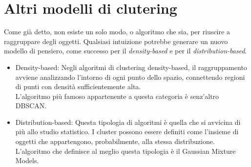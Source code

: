 \section{Altri modelli di clutering}
	Come già detto, non esiste un solo modo, o algoritmo che sia, per riuscire a raggruppare degli oggetti. Qualsiasi intuizione potrebbe generare un nuovo modello di pensiero, come successo per il \emph{density-based} e per il \emph{distribution-based}. 

	\begin{itemize}
		\item Density-based:
			Negli algoritmi di clustering density-based, il raggruppamento avviene analizzando l'intorno di ogni punto dello spazio, connettendo regioni di punti con densità sufficientemente alta\cite{Density_based_clustering}.\\
			L'algoritmo più famoso appartenente a questa categoria è senz'altro DBSCAN.
		
		\item Distribution-based:
			Questa tipologia di algoritmi è quella che si avvicina di più allo studio statistico. I cluster possono essere definiti come l'insieme di oggetti che appartengono, probabilmente, alla stessa distribuzione\cite{distribution-based_clustering}. \\
			L'algoritmo che definisce al meglio questa tipologia è il Gaussian Mixture Models.
	\end{itemize}